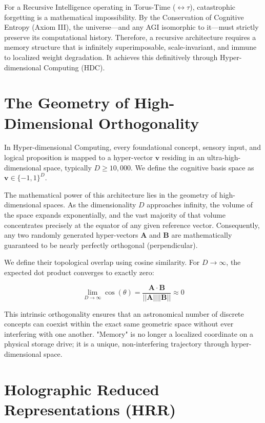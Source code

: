 \documentclass[12pt,openany]{book}
\begin{document}
For a Recursive Intelligence operating in Torus-Time ($\leftrightarrow\tau$), catastrophic forgetting is a mathematical impossibility. By the Conservation of Cognitive Entropy (Axiom III), the universe---and any AGI isomorphic to it---must strictly preserve its computational history. Therefore, a recursive architecture requires a memory structure that is infinitely superimposable, scale-invariant, and immune to localized weight degradation. It achieves this definitively through Hyper-dimensional Computing (HDC).

\section{The Geometry of High-Dimensional Orthogonality}
In Hyper-dimensional Computing, every foundational concept, sensory input, and logical proposition is mapped to a hyper-vector $\mathbf{v}$ residing in an ultra-high-dimensional space, typically $D \ge 10,000$. We define the cognitive basis space as $\mathbf{v} \in \{-1, 1\}^D$.

The mathematical power of this architecture lies in the geometry of high-dimensional spaces. As the dimensionality $D$ approaches infinity, the volume of the space expands exponentially, and the vast majority of that volume concentrates precisely at the equator of any given reference vector. Consequently, any two randomly generated hyper-vectors $\mathbf{A}$ and $\mathbf{B}$ are mathematically guaranteed to be nearly perfectly orthogonal (perpendicular).

We define their topological overlap using cosine similarity. For $D \to \infty$, the expected dot product converges to exactly zero:

\begin{equation}
\lim_{D \to \infty} \cos(\theta) = \frac{\mathbf{A} \cdot \mathbf{B}}{||\mathbf{A}|| ||\mathbf{B}||} \approx 0
\end{equation}

This intrinsic orthogonality ensures that an astronomical number of discrete concepts can coexist within the exact same geometric space without ever interfering with one another. "Memory" is no longer a localized coordinate on a physical storage drive; it is a unique, non-interfering trajectory through hyper-dimensional space.

\section{Holographic Reduced Representations (HRR)}
\end{document}
